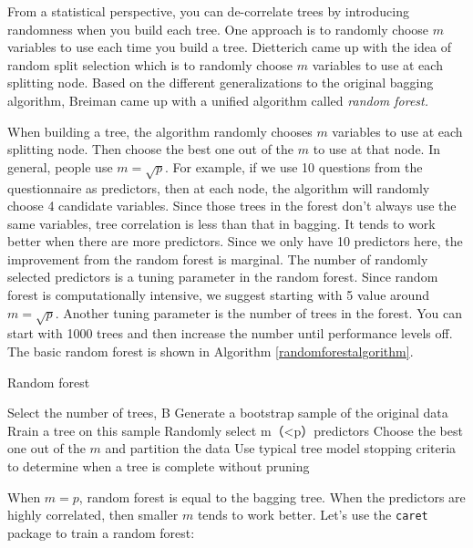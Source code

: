 \documentclass[12pt,]{krantz}
\begin{document}
From a statistical perspective, you can de-correlate trees by introducing randomness when you build each tree. One approach \citep{Ho1998, amit1997} is to randomly choose \(m\) variables to use each time you build a tree. Dietterich\citep{Dietterich2000} came up with the idea of random split selection which is to randomly choose \(m\) variables to use at each splitting node. Based on the different generalizations to the original bagging algorithm, Breiman \citep{Breiman2001} came up with a unified algorithm called \emph{random forest.}

When building a tree, the algorithm randomly chooses \(m\) variables to use at each splitting node. Then choose the best one out of the \(m\) to use at that node. In general, people use \(m=\sqrt{p}\). For example, if we use 10 questions from the questionnaire as predictors, then at each node, the algorithm will randomly choose 4 candidate variables. Since those trees in the forest don't always use the same variables, tree correlation is less than that in bagging. It tends to work better when there are more predictors. Since we only have 10 predictors here, the improvement from the random forest is marginal. The number of randomly selected predictors is a tuning parameter in the random forest. Since random forest is computationally intensive, we suggest starting with 5 value around \(m=\sqrt{p}\). Another tuning parameter is the number of trees in the forest. You can start with 1000 trees and then increase the number until performance levels off. The basic random forest is shown in Algorithm \ref{randomforestalgorithm}.

\begin{algorithm}
\caption{Random forest}\label{randomforestalgorithm} 
\begin{algorithmic}[1] 
\State Select the number of trees, B
        \State Generate a bootstrap sample of the original data
        \State Rrain a tree on this sample
                \State Randomly select m（<p）predictors
                \State Choose the best one out of the $m$ and partition the data
            \EndFor
        \State Use typical tree model stopping criteria to determine when a tree is complete without pruning
    \EndFor
\end{algorithmic}
\end{algorithm}

When \(m=p\), random forest is equal to the bagging tree. When the predictors are highly correlated, then smaller \(m\) tends to work better. Let's use the \texttt{caret} package to train a random forest:
\end{document}
